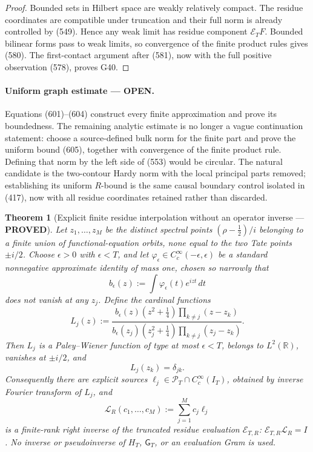 \documentclass[11pt]{article}
\newtheorem{theorem}{Theorem}
\newcommand{\PROVED}{\textcolor{green!45!black}{\textbf{PROVED}}}
\newcommand{\OPEN}{\textcolor{red!70!black}{\textbf{OPEN}}}
\begin{document}
\begin{proof}
Bounded sets in Hilbert space are weakly relatively compact.  The residue
coordinates are compatible under truncation and their full norm is already
controlled by (549).  Hence any weak limit has residue component
\(\mathcal E_TF\).  Bounded bilinear forms pass to weak limits, so convergence
of the finite product rules gives (580).  The first-contact argument after
(581), now with the full positive observation (578), proves G40.
\end{proof}

\paragraph{Uniform graph estimate --- \OPEN.}
Equations (601)--(604) construct every finite approximation and prove its
boundedness.  The remaining analytic estimate is no longer a vague
continuation statement: choose a source-defined bulk norm for the finite
part and prove the uniform bound (605), together with convergence of the
finite product rule.  Defining that norm by the left side of (553) would be
circular.  The natural candidate is the two-contour Hardy norm with the
local principal parts removed; establishing its uniform \(R\)-bound is the
same causal boundary control isolated in (417), now with all residue
coordinates retained rather than discarded.

\begin{theorem}[Explicit finite residue interpolation without an operator
inverse --- \PROVED]
Let \(z_1,\ldots,z_M\) be the distinct spectral points
\((\rho-\frac12)/i\) belonging to a finite union of functional-equation
orbits, none equal to the two Tate points \(\pm i/2\).  Choose
\(\epsilon>0\) with \(\epsilon<T\), and let
\(\varphi_\epsilon\in C_c^\infty(-\epsilon,\epsilon)\) be a standard
nonnegative approximate identity of mass one, chosen so narrowly that
\[
 b_\epsilon(z):=
 \int\varphi_\epsilon(t)e^{izt}\,dt
\]
does not vanish at any \(z_j\).  Define the cardinal functions
\begin{equation}
 L_j(z):=
 \frac{b_\epsilon(z)(z^2+\frac14)
       \prod_{k\ne j}(z-z_k)}
      {b_\epsilon(z_j)(z_j^2+\frac14)
       \prod_{k\ne j}(z_j-z_k)}.                     \tag{606}
\end{equation}
Then \(L_j\) is a Paley--Wiener function of type at most \(\epsilon<T\),
belongs to \(L^2(\mathbb R)\), vanishes at \(\pm i/2\), and
\begin{equation}
 L_j(z_k)=\delta_{jk}.                                \tag{607}
\end{equation}
Consequently there are explicit sources
\(\ell_j\in\mathcal P_T\cap C_c^\infty(I_T)\), obtained by inverse Fourier
transform of \(L_j\), and
\begin{equation}
 \mathscr L_R(c_1,\ldots,c_M):=
 \sum_{j=1}^Mc_j\ell_j                                \tag{608}
\end{equation}
is a finite-rank right inverse of the truncated residue evaluation
\(\mathcal E_{T,R}\):
\(\mathcal E_{T,R}\mathscr L_R=I\).
No inverse or pseudoinverse of \(H_T\), \(\mathsf G_T\), or an evaluation
Gram is used.
\end{theorem}
\end{document}
